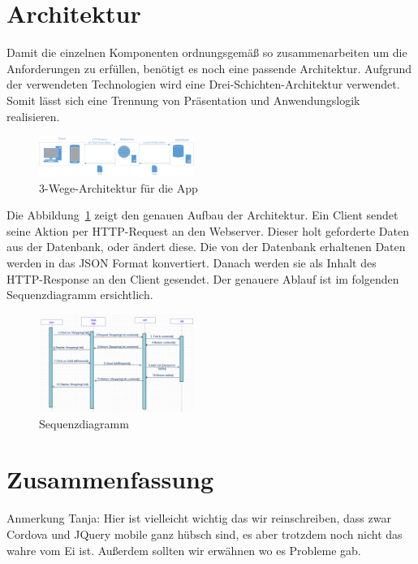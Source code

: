 \documentclass[10pt, conference, compsocconf]{IEEEtran}
\begin{document}
\section{Architektur}
{Damit die einzelnen Komponenten ordnungsgem\"a{\ss} so zusammenarbeiten um die Anforderungen zu erf\"ullen, ben\"otigt es noch eine passende Architektur. Aufgrund der verwendeten Technologien wird eine Drei-Schichten-Architektur verwendet. Somit l\"asst sich eine Trennung von Pr\"asentation und Anwendungslogik realisieren.
\begin{figure}[h!]
	\centering
	\includegraphics[width=0.45\textwidth]{./Bilder_Zeichnungen/Architektur.png}
	\caption{3-Wege-Architektur f\"ur die App}
	\label{fig:Architektur}
\end{figure}

Die Abbildung~\ref{fig:Architektur} zeigt den genauen Aufbau der Architektur. Ein Client sendet seine Aktion per HTTP-Request an den Webserver. Dieser holt geforderte Daten aus der Datenbank, oder \"andert diese. Die von der Datenbank erhaltenen Daten werden in das JSON Format konvertiert. Danach werden sie als Inhalt des HTTP-Response an den Client gesendet. Der genauere Ablauf ist im folgenden Sequenzdiagramm ersichtlich.
\begin{figure}[h!]
	\centering
	\includegraphics[width=0.45\textwidth]{./Bilder_Zeichnungen/Sequenzdiagramm.png}
	\caption{Sequenzdiagramm}
	\label{fig:Sequenzdiagramm}
\end{figure}

\section{Zusammenfassung}
Anmerkung Tanja: Hier ist vielleicht wichtig das wir reinschreiben, dass zwar Cordova und JQuery mobile ganz h\"ubsch sind, es aber trotzdem noch nicht das wahre vom Ei ist. Au{\ss}erdem sollten wir erw\"ahnen wo es Probleme gab.

}
\end{document}
